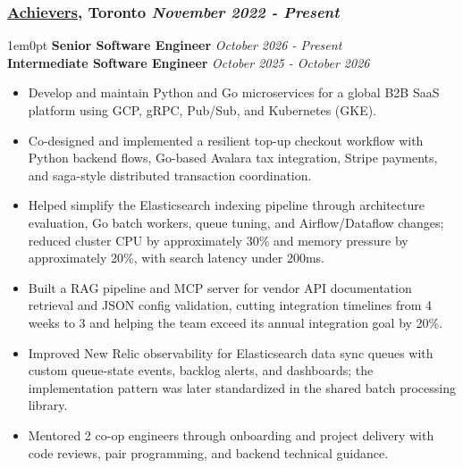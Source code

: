\documentclass[a4paper,10pt]{article}
\begin{document}
\subsubsection*{%
  \textbf{\href{https://www.achievers.com/}{Achievers}, Toronto}
  \hfill\textit{November 2022 - Present}
}
\begin{adjustwidth}{1em}{0pt}
\noindent\textbf{Senior Software Engineer}
\hfill\textit{October 2026 - Present}\\
\textbf{Intermediate Software Engineer}
\hfill\textit{October 2025 - October 2026}
\begin{itemize}
  \item Develop and maintain Python and Go microservices for a global B2B SaaS platform using GCP, gRPC, Pub/Sub, and Kubernetes (GKE).
  \item Co-designed and implemented a resilient top-up checkout workflow with Python backend flows, Go-based Avalara tax integration, Stripe payments, and saga-style distributed transaction coordination.
  \item Helped simplify the Elasticsearch indexing pipeline through architecture evaluation, Go batch workers, queue tuning, and Airflow/Dataflow changes; reduced cluster CPU by approximately 30\% and memory pressure by approximately 20\%, with search latency under 200ms.
  \item Built a RAG pipeline and MCP server for vendor API documentation retrieval and JSON config validation, cutting integration timelines from 4 weeks to 3 and helping the team exceed its annual integration goal by 20\%.
  \item Improved New Relic observability for Elasticsearch data sync queues with custom queue-state events, backlog alerts, and dashboards; the implementation pattern was later standardized in the shared batch processing library.
  \item Mentored 2 co-op engineers through onboarding and project delivery with code reviews, pair programming, and backend technical guidance.

\end{itemize}
\end{adjustwidth}
\end{document}
